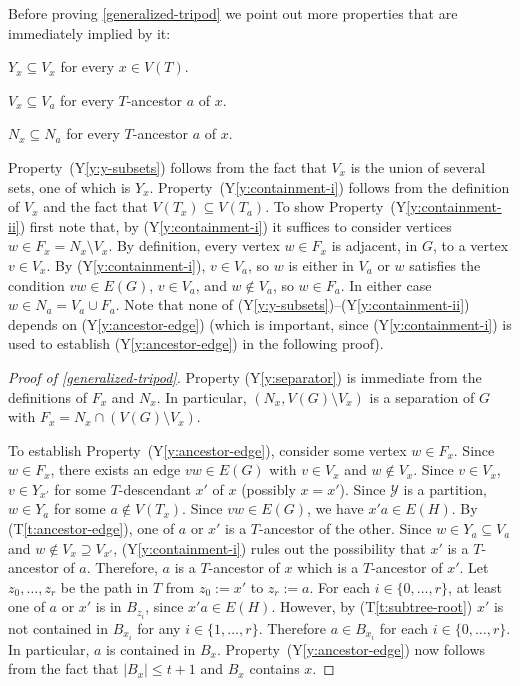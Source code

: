 \documentclass{patmorin}
\newcommand{\tref}[1]{(T\ref{t:#1})}
\newcommand{\ylabel}[1]{\label{y:#1}}
\newcommand{\yref}[1]{(Y\ref{y:#1})}
\renewcommand{\le}{\leqslant}
\begin{document}
Before proving \cref{generalized-tripod} we point out more properties that are immediately implied by it:

\begin{compactenum}[(Y1)]\setcounter{enumi}{3}
  \item\ylabel{y-subsets} $Y_x\subseteq V_x$ for every $x\in V(T)$. 
  \item\ylabel{containment-i} $V_x\subseteq V_a$ for every $T$-ancestor $a$ of $x$. 
  \item\ylabel{containment-ii}$N_x\subseteq N_a$ for every $T$-ancestor $a$ of $x$.
\end{compactenum}

Property~\yref{y-subsets} follows from the fact that $V_x$ is the union of several sets, one of which is $Y_x$.  Property~\yref{containment-i} follows from the definition of $V_x$ and the fact that $V(T_x)\subseteq V(T_a)$. To show Property~\yref{containment-ii} first note that, by \yref{containment-i} it suffices to consider vertices $w\in F_x=N_x\setminus V_x$. By definition, every vertex $w\in F_x$ is adjacent, in $G$, to a vertex $v\in V_x$.  By \yref{containment-i}, $v\in V_a$, so $w$ is either in $V_a$ or $w$ satisfies the condition $vw\in E(G)$, $v\in V_a$, and $w\not\in V_a$, so $w\in F_a$.  In either case $w\in N_a=V_a\cup F_a$.  Note that none of \yref{y-subsets}--\yref{containment-ii} depends on \yref{ancestor-edge} (which is important, since \yref{containment-i} is used to establish \yref{ancestor-edge} in the following proof).


\begin{proof}[Proof of \cref{generalized-tripod}]
  Property \yref{separator} is immediate from the definitions of $F_x$ and $N_x$.  In particular, $(N_x,V(G)\setminus V_x)$ is a separation of $G$ with $F_x=N_x\cap(V(G)\setminus V_x)$. 

  To establish Property~\yref{ancestor-edge}, consider some vertex $w\in F_x$.  Since $w\in F_x$, there exists an edge $vw\in E(G)$ with $v\in V_x$ and $w\not\in V_x$.  Since $v\in V_x$, $v\in Y_{x'}$ for some $T$-descendant $x'$ of $x$ (possibly $x=x'$). Since $\mathcal{Y}$ is a partition, $w\in Y_{a}$ for some $a\not\in V(T_x)$.  Since $vw\in E(G)$, we have $x'a\in E(H)$.  By \tref{ancestor-edge}, one of $a$ or $x'$ is a $T$-ancestor of the other. Since $w\in Y_a\subseteq V_a$ and $w\not\in V_x\supseteq V_{x'}$, \yref{containment-i} rules out the possibility that $x'$ is a $T$-ancestor of $a$. Therefore, $a$ is a $T$-ancestor of $x$ which is a $T$-ancestor of $x'$.  Let $z_0,\ldots,z_r$ be the path in $T$ from $z_0:=x'$ to $z_r:=a$.  For each $i\in\{0,\ldots,r\}$, at least one of $a$ or $x'$ is in $B_{z_i}$, since $x'a\in E(H)$.  However, by \tref{subtree-root} $x'$ is not contained in $B_{x_i}$ for any $i\in\{1,\ldots,r\}$.  Therefore $a\in B_{x_i}$ for each $i\in\{0,\ldots,r\}$.  In particular, $a$ is contained in $B_x$.
  Property~\yref{ancestor-edge} now follows from the fact that $|B_x|\le t+1$ and $B_x$ contains $x$.
\end{proof}
\end{document}
